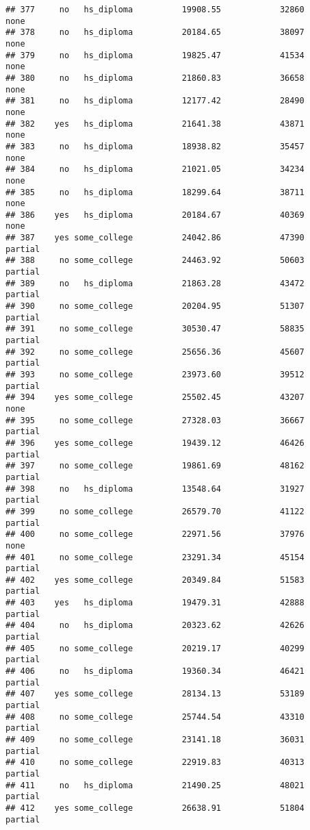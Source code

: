\documentclass[
]{article}
\begin{document}
\begin{verbatim}
## 377     no   hs_diploma          19908.55            32860        none
## 378     no   hs_diploma          20184.65            38097        none
## 379     no   hs_diploma          19825.47            41534        none
## 380     no   hs_diploma          21860.83            36658        none
## 381     no   hs_diploma          12177.42            28490        none
## 382    yes   hs_diploma          21641.38            43871        none
## 383     no   hs_diploma          18938.82            35457        none
## 384     no   hs_diploma          21021.05            34234        none
## 385     no   hs_diploma          18299.64            38711        none
## 386    yes   hs_diploma          20184.67            40369        none
## 387    yes some_college          24042.86            47390     partial
## 388     no some_college          24463.92            50603     partial
## 389     no   hs_diploma          21863.28            43472     partial
## 390     no some_college          20204.95            51307     partial
## 391     no some_college          30530.47            58835     partial
## 392     no some_college          25656.36            45607     partial
## 393     no some_college          23973.60            39512     partial
## 394    yes some_college          25502.45            43207        none
## 395     no some_college          27328.03            36667     partial
## 396    yes some_college          19439.12            46426     partial
## 397     no some_college          19861.69            48162     partial
## 398     no   hs_diploma          13548.64            31927     partial
## 399     no some_college          26579.70            41122     partial
## 400     no some_college          22971.56            37976        none
## 401     no some_college          23291.34            45154     partial
## 402    yes some_college          20349.84            51583     partial
## 403    yes   hs_diploma          19479.31            42888     partial
## 404     no   hs_diploma          20323.62            42626     partial
## 405     no some_college          20219.17            40299     partial
## 406     no   hs_diploma          19360.34            46421     partial
## 407    yes some_college          28134.13            53189     partial
## 408     no some_college          25744.54            43310     partial
## 409     no some_college          23141.18            36031     partial
## 410     no some_college          22919.83            40313     partial
## 411     no   hs_diploma          21490.25            48021     partial
## 412    yes some_college          26638.91            51804     partial

\end{verbatim}
\end{document}
